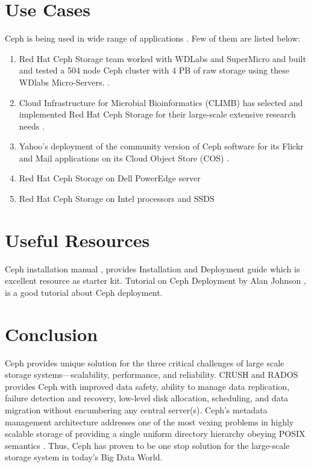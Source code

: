 \documentclass[9pt,twocolumn,twoside]{styles/osajnl}
\begin{document}
\section{Use Cases}
Ceph is being used in wide range of applications
\cite{www-ceph-usecases}. Few of them are listed below:
\begin{enumerate}
\item Red Hat Ceph Storage team worked with WDLabs and SuperMicro and
  built and tested a 504 node Ceph cluster with 4 PB of raw storage
  using these WDlabs Micro-Servers. \cite{wdlabs-ceph}.
\item Cloud Infrastructure for Microbial Bioinformatics (CLIMB) has
  selected and implemented Red Hat Ceph Storage for their large-scale
  extensive research needs \cite{climb-ceph}.
\item Yahoo's deployment of the community version of Ceph software for
  its Flickr and Mail applications on its Cloud Object Store (COS)
  \cite{yahoo-ceph-deploy}.
\item Red Hat Ceph Storage on Dell PowerEdge server
\item Red Hat Ceph Storage on Intel processors and SSDS
\end{enumerate}

\section{Useful Resources}
Ceph installation manual \cite{www-ceph-install}, provides
Installation and Deployment guide which is excellent resource as
starter kit. Tutorial on Ceph Deployment by Alan
Johnson\cite{ceph-deploy-guide} , is a good tutorial about Ceph
deployment.

\section{Conclusion}
Ceph provides unique solution for the three critical challenges of
large scale storage systems—scalability, performance, and
reliability. CRUSH and RADOS provides Ceph with improved data safety,
ability to manage data replication, failure detection and recovery,
low-level disk allocation, scheduling, and data migration without
encumbering any central server(s). Ceph’s metadata management
architecture addresses one of the most vexing problems in highly
scalable storage of providing a single uniform directory hierarchy
obeying POSIX semantics \cite{paper-Ceph}. Thus, Ceph has proven to be
one stop solution for the large-scale storage system in today's Big
Data World.
\end{document}
